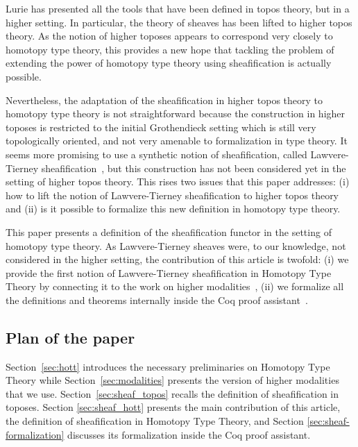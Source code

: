 \documentclass[notfinal]{jfrarticle}
\begin{document}
Lurie has presented all the tools that have been defined in
topos theory, but in a higher setting. In particular, the theory of
sheaves has been lifted to higher topos theory.
%
As the notion of higher toposes appears to correspond very closely to
homotopy type theory, this provides a new hope that tackling the
problem of extending the power of homotopy type theory using
sheafification is actually possible.

Nevertheless, the adaptation of the sheafification in higher topos
theory to homotopy type theory is not straightforward because the
construction in higher toposes is restricted to the initial Grothendieck
setting which is still very topologically oriented, and not very
amenable to formalization in type theory. It seems more promising to
use a synthetic notion of sheafification, called Lawvere-Tierney
sheafification~\cite{tierney1972sheaf,maclanemoerdijk}, but this construction has not
been considered yet in the setting of higher topos theory. This rises
two issues that this paper addresses: (i) how to lift the notion of
Lawvere-Tierney sheafification to higher topos theory and (ii) is it
possible to formalize this new definition in homotopy type theory.



This paper presents a definition of the
sheafification functor in the setting of homotopy type theory. As
Lawvere-Tierney sheaves were, to our knowledge, not considered in the
higher setting, the contribution of this article is twofold: (i) we
provide the first notion of Lawvere-Tierney sheafification in Homotopy
Type Theory by connecting it to the work on higher
modalities~\cite{hottbook}, (ii) we formalize all the definitions and
theorems internally inside the Coq proof assistant~\cite{Coq:manual}.

\subsection*{Plan of the paper}

Section~\ref{sec:hott} introduces the necessary preliminaries on
Homotopy Type Theory while Section~\ref{sec:modalities} presents the
version of higher modalities that we
use. Section~\ref{sec:sheaf_topos} recalls the definition of
sheafification in toposes. Section \ref{sec:sheaf_hott} presents the
main contribution of this article, the definition of sheafification in
Homotopy Type Theory, and Section \ref{sec:sheaf-formalization}
discusses its formalization inside the Coq proof assistant. 
\end{document}
